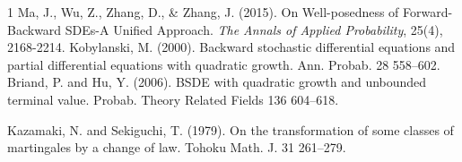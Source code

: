 \begin{thebibliography}{1}
Ma, J., Wu, Z., Zhang, D., \& Zhang, J. (2015). On Well-posedness of Forward-Backward SDEs-A Unified Approach. \textit{The Annals of Applied Probability}, 25(4), 2168-2214.
Kobylanski, M. (2000). Backward stochastic differential equations and partial differential equations with quadratic growth. Ann. Probab. 28 558–602.
 Briand, P. and Hu, Y. (2006). BSDE with quadratic growth and unbounded terminal value. Probab. Theory Related Fields 136 604–618.

 Kazamaki, N. and Sekiguchi, T. (1979). On the transformation of some classes of martingales by a change of law. Tohoku Math. J. 31 261–279.
\end{thebibliography}
